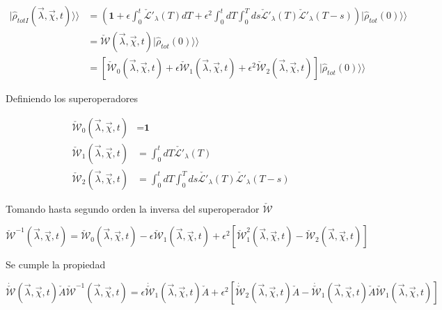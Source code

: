 \begin{appendixs}
\begin{align*}
    |\hat{\rho}_{totI}(\vec{\lambda},\vec{\chi},t)\rangle \rangle  & = \left( \textbf{1} + \epsilon \int_{0}^{t}\check{\mathcal{L}}'_{\lambda}(T)dT + \epsilon^{2}\int_{0}^{t}dT\int_{0}^{T}ds \check{\mathcal{L}}'_{\lambda}(T)\check{\mathcal{L}}'_{\lambda}(T-s) \right)|\hat{\rho}_{tot}(0)\rangle \rangle  \\
    & = \check{\mathcal{W}}(\vec{\lambda},\vec{\chi},t)|\hat{\rho}_{tot}(0)\rangle \rangle \\
    & =  [\check{\mathcal{W}}_{0}(\vec{\lambda},\vec{\chi},t) + \epsilon \check{\mathcal{W}}_{1}(\vec{\lambda},\vec{\chi},t) + \epsilon^{2}\check{\mathcal{W}}_{2}(\vec{\lambda},\vec{\chi},t)] |\hat{\rho}_{tot}(0)\rangle \rangle 
\end{align*}

Definiendo los superoperadores

\begin{align*}
    \check{\mathcal{W}}_{0}(\vec{\lambda},\vec{\chi},t) &  = \textbf{1}\\
    \check{\mathcal{W}}_{1}(\vec{\lambda},\vec{\chi},t) & = \int_{0}^{t}dT \check{\mathcal{L}'}_{\lambda}(T) \\
    \check{\mathcal{W}}_{2}(\vec{\lambda},\vec{\chi},t) & = \int_{0}^{t}dT \int_{0}^{T}ds \check{\mathcal{L}'}_{\lambda}(T)\check{\mathcal{L}'}_{\lambda}(T-s)
\end{align*}

Tomando hasta segundo orden la inversa del superoperador $\check{\mathcal{W}}$

\begin{equation}
    \check{\mathcal{W}}^{-1}(\vec{\lambda},\vec{\chi},t) =  \check{\mathcal{W}}_{0}(\vec{\lambda},\vec{\chi},t) - \epsilon  \check{\mathcal{W}}_{1}(\vec{\lambda},\vec{\chi},t) +  \epsilon^{2}[\check{\mathcal{W}}^{2}_{1}(\vec{\lambda},\vec{\chi},t) -  \check{\mathcal{W}}_{2}(\vec{\lambda},\vec{\chi},t) ]
\label{apendix2inverseW}
\end{equation}

Se cumple la propiedad

\begin{equation}
    \dot{\check{\mathcal{W}}}(\vec{\lambda},\vec{\chi},t)\check{A}\check{\mathcal{W}}^{-1}(\vec{\lambda},\vec{\chi},t) = \epsilon \dot{\check{\mathcal{W}}}_{1}(\vec{\lambda},\vec{\chi},t)\check{A} + \epsilon^{2}[\dot{\check{\mathcal{W}}}_{2}(\vec{\lambda},\vec{\chi},t)\check{A} - \dot{\check{\mathcal{W}}}_{1}(\vec{\lambda},\vec{\chi},t)\check{A}\check{\mathcal{W}}_{1}(\vec{\lambda},\vec{\chi},t) ]
    \label{apendix2Wproperty}
\end{equation}


\end{appendixs}
